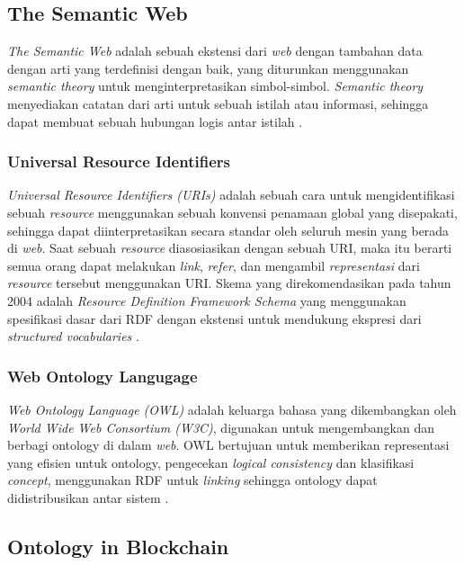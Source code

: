 \subsection{The Semantic Web}
\label{subsec:the-semantic-web}

\textit{The Semantic Web} adalah sebuah ekstensi dari \textit{web} dengan tambahan data dengan arti yang terdefinisi dengan baik, yang diturunkan menggunakan \textit{semantic theory} untuk menginterpretasikan simbol-simbol. \textit{Semantic theory} menyediakan catatan dari arti untuk sebuah istilah atau informasi, sehingga dapat membuat sebuah hubungan logis antar istilah \parencite{shadbolt2006semantic}.

\subsubsection{Universal Resource Identifiers}
\label{subsubsec:universal-resource-identifiers}

\textit{Universal Resource Identifiers (URIs)} adalah sebuah cara untuk mengidentifikasi sebuah \textit{resource} menggunakan sebuah konvensi penamaan global yang disepakati, sehingga dapat diinterpretasikan secara standar oleh seluruh mesin yang berada di \textit{web}. Saat sebuah \textit{resource} diasosiasikan dengan sebuah URI, maka itu berarti semua orang dapat melakukan \textit{link}, \textit{refer}, dan mengambil \textit{representasi} dari \textit{resource} tersebut menggunakan URI. Skema yang direkomendasikan pada tahun 2004 adalah \textit{Resource Definition Framework Schema} yang menggunakan spesifikasi dasar dari RDF dengan ekstensi untuk mendukung ekspresi dari \textit{structured vocabularies} \parencite{shadbolt2006semantic}.

\subsubsection{Web Ontology Langugage}
\label{subsubsec:web-ontology-language}

\textit{Web Ontology Language (OWL)} adalah keluarga bahasa yang dikembangkan oleh \textit{World Wide Web Consortium (W3C)}, digunakan untuk mengembangkan dan berbagi ontology di dalam \textit{web}. OWL bertujuan untuk memberikan representasi yang efisien untuk ontology, pengecekan \textit{logical consistency} dan klasifikasi \textit{concept}, menggunakan RDF untuk \textit{linking} sehingga ontology dapat didistribusikan antar sistem \parencite{shadbolt2006semantic}.

\subsection{Ontology in Blockchain}
\label{subsec:ontology-in-blockchain}

